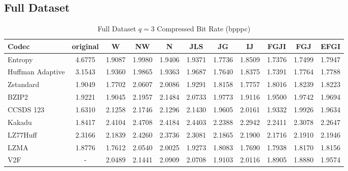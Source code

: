 \documentclass{article}
\begin{document}
\subsection{Full Dataset}
\begin{table}[h!]
\centering
\caption{Full Dataset $q=3$ Compressed Bit Rate (bpppc)}
\begin{tabular}{|l|cccccccccc|}
\hline
Codec &  original &      W &     NW &      N &    JLS &     JG &     IJ &   FGJI &    FGJ &   EFGI \\
\hline
Entropy & 4.6775 & 1.9087 & 1.9980 & 1.9406 & 1.9371 & 1.7736 & 1.8509 & 1.7376 & 1.7499 & 1.7947 \\
\hline
Huffman Adaptive &    3.1543 & 1.9360 & 1.9865 & 1.9363 & 1.9687 & 1.7640 & 1.8375 & 1.7391 & 1.7764 & 1.7788 \\
Zstandard        &    1.9049 & 1.7702 & 2.0607 & 2.0086 & 1.9291 & 1.8158 & 1.7757 & 1.8016 & 1.8239 & 1.8223 \\
BZIP2            &    1.9221 & 1.9045 & 2.1957 & 2.1484 & 2.0733 & 1.9773 & 1.9116 & 1.9500 & 1.9742 & 1.9694 \\
CCSDS 123        &    1.6310 & 2.1258 & 2.1746 & 2.1296 & 2.1430 & 1.9605 & 2.0161 & 1.9332 & 1.9926 & 1.9634 \\
Kakadu           &    1.8417 & 2.4104 & 2.4708 & 2.4184 & 2.4403 & 2.2388 & 2.2942 & 2.2411 & 2.3078 & 2.2647 \\
LZ77Huff         &    2.3166 & 2.1839 & 2.4260 & 2.3736 & 2.3081 & 2.1865 & 2.1900 & 2.1716 & 2.1910 & 2.1946 \\
LZMA             &    1.8776 & 1.7612 & 2.0540 & 2.0025 & 1.9273 & 1.8083 & 1.7690 & 1.7938 & 1.8170 & 1.8156 \\
V2F              &   - & 2.0489 & 2.1441 & 2.0909 & 2.0708 & 1.9103 & 2.0116 & 1.8905 & 1.8880 & 1.9574 \\
\hline
\end{tabular}
\end{table}
\end{document}
